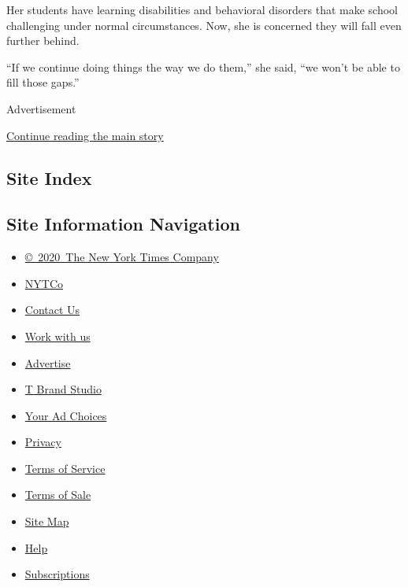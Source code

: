 Her students have learning disabilities and behavioral disorders that
make school challenging under normal circumstances. Now, she is
concerned they will fall even further behind.

``If we continue doing things the way we do them,'' she said, ``we won't
be able to fill those gaps.''

Advertisement

\protect\hyperlink{after-bottom}{Continue reading the main story}

\hypertarget{site-index}{%
\subsection{Site Index}\label{site-index}}

\hypertarget{site-information-navigation}{%
\subsection{Site Information
Navigation}\label{site-information-navigation}}

\begin{itemize}
\tightlist
\item
  \href{https://help.nytimes3xbfgragh.onion/hc/en-us/articles/115014792127-Copyright-notice}{©~2020~The
  New York Times Company}
\end{itemize}

\begin{itemize}
\tightlist
\item
  \href{https://www.nytco.com/}{NYTCo}
\item
  \href{https://help.nytimes3xbfgragh.onion/hc/en-us/articles/115015385887-Contact-Us}{Contact
  Us}
\item
  \href{https://www.nytco.com/careers/}{Work with us}
\item
  \href{https://nytmediakit.com/}{Advertise}
\item
  \href{http://www.tbrandstudio.com/}{T Brand Studio}
\item
  \href{https://www.nytimes3xbfgragh.onion/privacy/cookie-policy\#how-do-i-manage-trackers}{Your
  Ad Choices}
\item
  \href{https://www.nytimes3xbfgragh.onion/privacy}{Privacy}
\item
  \href{https://help.nytimes3xbfgragh.onion/hc/en-us/articles/115014893428-Terms-of-service}{Terms
  of Service}
\item
  \href{https://help.nytimes3xbfgragh.onion/hc/en-us/articles/115014893968-Terms-of-sale}{Terms
  of Sale}
\item
  \href{https://spiderbites.nytimes3xbfgragh.onion}{Site Map}
\item
  \href{https://help.nytimes3xbfgragh.onion/hc/en-us}{Help}
\item
  \href{https://www.nytimes3xbfgragh.onion/subscription?campaignId=37WXW}{Subscriptions}
\end{itemize}
